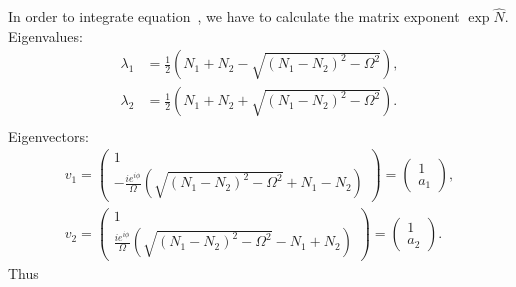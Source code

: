 In order to integrate equation~,
we have to calculate the matrix exponent $\exp \hat{N}$.
Eigenvalues:
\begin{equation*}
\begin{split}
    \lambda_1 & = \frac{1}{2} \left(
        N_1 + N_2 - \sqrt{(N_1 - N_2)^2 - \Omega^2}
    \right), \\
    \lambda_2 & = \frac{1}{2} \left(
        N_1 + N_2 + \sqrt{(N_1 - N_2)^2 - \Omega^2}
    \right). \\
\end{split}
\end{equation*}
Eigenvectors:
\begin{equation*}
\begin{split}
    v_1 = \begin{pmatrix}
        1 \\
        -\frac{i e^{i \phi}}{\Omega} \left(
            \sqrt{(N_1 - N_2)^2 - \Omega^2} + N_1 - N_2
        \right)
    \end{pmatrix}
    = \begin{pmatrix}
        1 \\ a_1
    \end{pmatrix}, \\
    v_2 = \begin{pmatrix}
        1 \\
        \frac{i e^{i \phi}}{\Omega} \left(
            \sqrt{(N_1 - N_2)^2 - \Omega^2} - N_1 + N_2
        \right)
    \end{pmatrix}
    = \begin{pmatrix}
        1 \\ a_2
    \end{pmatrix}.
\end{split}
\end{equation*}
Thus
